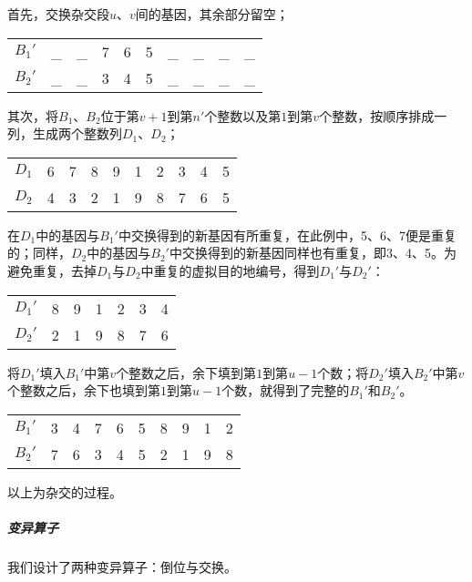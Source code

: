 \documentclass[UTF8,cs4size]{ctexart}
\begin{document}
首先，交换杂交段$u$、$v$间的基因，其余部分留空；
\begin{center}
\begin{tabular}{c|ccccccccc}
$B_1'$ & \_ & \_ & 7 & 6 & 5 & \_ & \_ & \_ & \_  \\
$B_2'$ & \_ & \_ & 3 & 4 & 5 & \_ & \_ & \_ & \_
\end{tabular}
\end{center}
其次，将$B_1$、$B_2$位于第$v+1$到第$n'$个整数以及第$1$到第$v$个整数，按顺序排成一列，生成两个整数列$D_1$、$D_2$；
\begin{center}
\begin{tabular}{c|ccccccccc}
$D_1$ & 6 & 7 & 8 & 9 & 1 & 2 & 3 & 4 & 5 \\
$D_2$ & 4 & 3 & 2 & 1 & 9 & 8 & 7 & 6 & 5
\end{tabular}
\end{center}
在$D_1$中的基因与$B_1'$中交换得到的新基因有所重复，在此例中，5、6、7便是重复的；同样，$D_2$中的基因与$B_2'$中交换得到的新基因同样也有重复，即3、4、5。为避免重复，去掉$D_1$与$D_2$中重复的虚拟目的地编号，得到$D_1'$与$D_2'$：
\begin{center}
\begin{tabular}{c|cccccc}
$D_1'$ & 8 & 9 & 1 & 2 & 3 & 4 \\
$D_2'$ & 2 & 1 & 9 & 8 & 7 & 6
\end{tabular}
\end{center}
将$D_1'$填入$B_1'$中第$v$个整数之后，余下填到第$1$到第$u-1$个数；将$D_2'$填入$B_2'$中第$v$个整数之后，余下也填到第$1$到第$u-1$个数，就得到了完整的$B_1'$和$B_2'$。
\begin{center}
\begin{tabular}{c|ccccccccc}
$B_1'$ & 3 & 4 & 7 & 6 & 5 & 8 & 9 & 1 & 2  \\
$B_2'$ & 7 & 6 & 3 & 4 & 5 & 2 & 1 & 9 & 8
\end{tabular}
\end{center}
以上为杂交的过程。
\subparagraph{变异算子}
我们设计了两种变异算子：倒位与交换。
\end{document}
